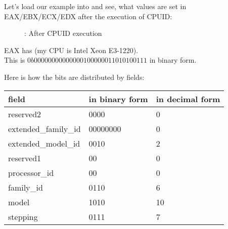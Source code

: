 ﻿\clearpage
{}
\myindex{\olly}

Let's load our example into \olly 
and see, what values are set in EAX/EBX/ECX/EDX after the execution of CPUID: 

\begin{figure}[H]
\centering
{}
\caption{\olly: After CPUID execution}
\label{fig:cpuid_olly_1}
\end{figure}

EAX has  (my \ac{CPU} is Intel Xeon E3-1220).\\
This is $0b0000 0000 0000 0010 0000 0110 1010 0111$ in binary form.

Here is how the bits are distributed by fields:

\begin{center}
\begin{tabular}{ | l | l | l | }
\hline
\headercolor{} field &
\headercolor{} in binary form &
\headercolor{} in decimal form \\
\hline
reserved2		& 0000 & 0 \\
\hline
extended\_family\_id	& 00000000 & 0 \\
\hline
extended\_model\_id	& 0010 & 2 \\
\hline
reserved1		& 00 & 0 \\
\hline
processor\_id		& 00 & 0 \\
\hline
family\_id		& 0110 & 6 \\
\hline
model			& 1010 & 10 \\
\hline
stepping		& 0111 & 7 \\
\hline
\end{tabular}
\end{center}


